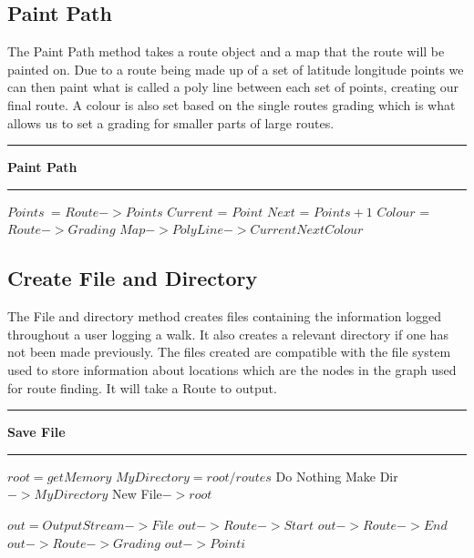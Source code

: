 \documentclass[10pt,a4paper]{article}
\begin{document}
\subsection{Paint Path}
The Paint Path method takes a route object and a map that the route will be painted on. Due to a route being made up of a set of latitude longitude points we can then paint what is called a poly line between each set of points, creating our final route. A colour is also set based on the single routes grading which is what allows us to set a grading for smaller parts of large routes. 
\vspace{0.3cm}
\hrule
\vspace{0.2cm}
\textbf{Paint Path}
\vspace{0.1cm}
\hrule
\vspace{0.1cm}
\begin{algorithmic}[1]
\State $Points$\ = $Route -> Points$
	\State $Current$ = $Point$
		\State $Next$ = $Points + 1$
		\State $Colour$ = $Route -> Grading$
		\State $Map -> Poly Line -> Current  Next Colour$
		
	\EndIf
\EndFor
\end{algorithmic}
\newpage
\subsection{Create File and Directory}
The File and directory method creates files containing the information logged throughout a user logging a walk. It also creates a relevant directory if one has not been made previously. The files created are compatible with the file system used to store information about locations which are the nodes in the graph used for route finding. It will take a Route to output.

\vspace{0.3cm}
\hrule
\vspace{0.2cm}
\textbf{Save File}
\vspace{0.1cm}
\hrule
\vspace{0.1cm}
\begin{algorithmic}[1]
\State $root = get Memory$
\State $My Directory = root/routes$
	\State Do Nothing
	\Else
\State Make Dir $->My Directory$
\EndIf
\State New File$-> root$

\State $out = Output Stream -> File$
\State $out -> Route ->Start$
\State $out -> Route -> End$
\State $out -> Route -> Grading$
	\State $out -> Point i$
\EndFor

\end{algorithmic}
\end{document}
